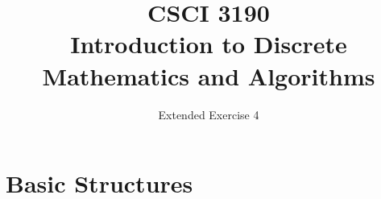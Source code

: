 \documentclass{../../cls/sig-alternate-05-2015}
\begin{document}






%

\title{CSCI 3190 \\ Introduction to Discrete Mathematics and Algorithms}
\subtitle{Extended Exercise 4}

\maketitle
\begin{abstract}

\end{abstract}

\keywords{}

\section{Basic Structures}
\end{document}
